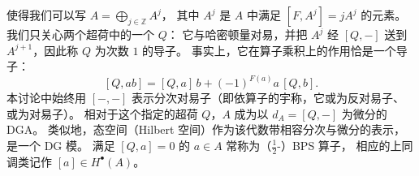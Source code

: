 

使得我们可以写 $A = \bigoplus_{j\in\mathbb{Z}} A^j$，
其中 $A^j$ 是 $A$ 中满足 $[F,A^j] = jA^j$ 的元素。我们只关心两个超荷中的一个 $Q$：
它与哈密顿量对易，并把 $A^j$ 经 $[Q,-]$ 送到 $A^{j+1}$，因此称 $Q$ 为次数 $1$ 的导子。
事实上，它在算子乘积上的作用恰是一个导子：
\begin{equation}\tag{3.25}
[Q,ab] = [Q,a]\,b + (-1)^{F(a)} a\,[Q,b] .
\end{equation}
本讨论中始终用 $[-, -]$ 表示分次对易子（即依算子的宇称，它或为反对易子、或为对易子）。
相对于这个指定的超荷 $Q$，$A$ 成为以 $d_A = [Q,-]$ 为微分的 DGA。
类似地，态空间（Hilbert 空间）作为该代数带相容分次与微分的表示，是一个 DG 模。
满足 $[Q,a]=0$ 的 $a\in A$ 常称为（$\frac{1}{2}$-）BPS 算子，
相应的上同调类记作 $[a]\in H^\bullet(A)$。


